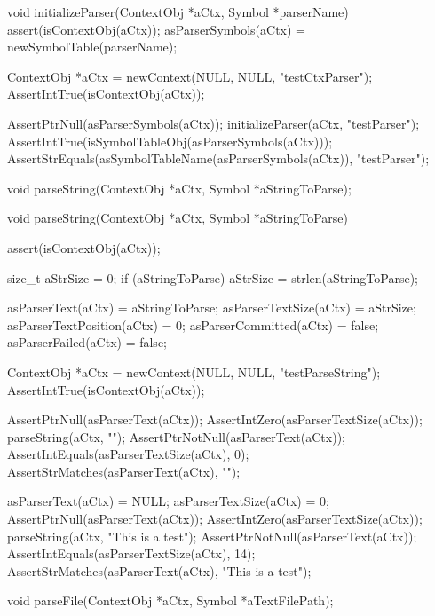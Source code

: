 \startCCode
void initializeParser(ContextObj *aCtx, Symbol *parserName) {
  assert(isContextObj(aCtx));
  asParserSymbols(aCtx) = newSymbolTable(parserName);
}
\stopCCode


\startCTest
  ContextObj *aCtx = newContext(NULL, NULL, "testCtxParser");
  AssertIntTrue(isContextObj(aCtx));
  
  AssertPtrNull(asParserSymbols(aCtx));
  initializeParser(aCtx, "testParser");
  AssertIntTrue(isSymbolTableObj(asParserSymbols(aCtx)));
  AssertStrEquals(asSymbolTableName(asParserSymbols(aCtx)), "testParser");
\stopCTest
\stopTestCase
\stopTestSuite


\startTestSuite[parseString]

\startCHeader
void parseString(ContextObj *aCtx, Symbol *aStringToParse);
\stopCHeader

\startCCode
void parseString(ContextObj *aCtx, Symbol *aStringToParse) {
  assert(isContextObj(aCtx));
  
  size_t aStrSize = 0;
  if (aStringToParse) aStrSize = strlen(aStringToParse);
    
  asParserText(aCtx)         = aStringToParse;
  asParserTextSize(aCtx)     = aStrSize;
  asParserTextPosition(aCtx) = 0;
  asParserCommitted(aCtx)    = false;
  asParserFailed(aCtx)       = false;
}
\stopCCode


\startCTest
  ContextObj *aCtx = newContext(NULL, NULL, "testParseString");
  AssertIntTrue(isContextObj(aCtx));
  
  AssertPtrNull(asParserText(aCtx));
  AssertIntZero(asParserTextSize(aCtx));
  parseString(aCtx, "");
  AssertPtrNotNull(asParserText(aCtx));
  AssertIntEquals(asParserTextSize(aCtx), 0);
  AssertStrMatches(asParserText(aCtx), "");
  
  asParserText(aCtx)     = NULL;
  asParserTextSize(aCtx) = 0;
  AssertPtrNull(asParserText(aCtx));
  AssertIntZero(asParserTextSize(aCtx));
  parseString(aCtx, "This is a test");
  AssertPtrNotNull(asParserText(aCtx));
  AssertIntEquals(asParserTextSize(aCtx), 14);
  AssertStrMatches(asParserText(aCtx), "This is a test");
\stopCTest
\stopTestCase
\stopTestSuite

\startTestSuite[parseFile]

\startCHeader
void parseFile(ContextObj *aCtx, Symbol *aTextFilePath);
\stopCHeader

